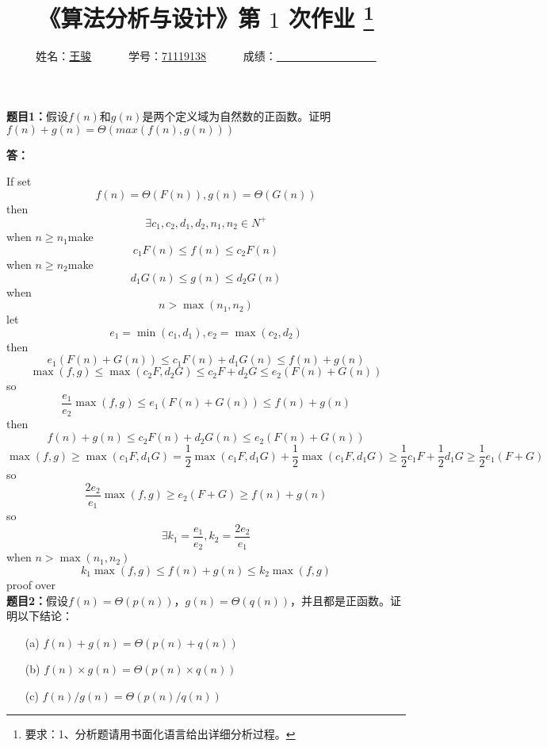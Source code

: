 \documentclass[12pt,a4paper]{article}
\begin{document}
\begin{CJK*}{UTF8}{gbsn}

  \title{
    {\textbf{《算法分析与设计》第 {$1$} 次作业}
      \footnote{要求：1、分析题请用书面化语言给出详细分析过程。}
    }
  }
  \date{}

  \author{
    姓名：\underline{王骏}~~~~~~
    学号：\underline{71119138}~~~~~~
    成绩：\underline{~~~~~~~~~~~~~~~~~~}
  }

  \maketitle

  \noindent
  \section*{\bf \color{red}{算法分析题}}
  \noindent
  {\bf 题目1：}假设$f(n)$和$g(n)$是两个定义域为自然数的正函数。证明 $f(n)+g(n)=\varTheta(max(f(n),g(n)))$

  \vspace{5pt}
  \noindent
  {\bf 答：}

    If set
    $$f(n) = \varTheta(F(n)), g(n) = \varTheta(G(n))$$ 
    then 
    $$\exists c_1,c_2,d_1,d_2,n_1,n_2\in N^+$$
    when $n \geq n_1$make
    $$c_1F(n) \leq f(n) \leq c_2F(n)$$
    when $n \geq n_2$make
    $$d_1G(n) \leq g(n) \leq d_2G(n)$$
    when
    $$n > \max(n_1,n_2)$$
    let 
    $$e_1 = \min(c_1,d_1), e_2 = \max(c_2,d_2)$$
    then
    $$ e_1 (F(n)+G(n)) \leq c_1F(n) + d_1G(n) \leq f(n) + g(n)$$
    $$ \max(f,g) \leq \max(c_2F,d_2G) \leq c_2F + d_2G \leq e_2 (F(n)+G(n))$$
    so 
    $$ \frac{e_1}{e_2} \max(f,g) \leq e_1(F(n)+G(n)) \leq f(n)+g(n)$$
    then
    $$f(n) + g(n) \leq c_2F(n) + d_2G(n) \leq e_2(F(n)+G(n))$$ 
    $$\max(f,g) \geq \max(c_1F,d_1G) = \frac{1}{2} \max(c_1F,d_1G) + \frac{1}{2} \max(c_1F,d_1G) \geq \frac{1}{2}c_1F + \frac{1}{2}d_1G \geq \frac{1}{2}e_1(F+G) $$
    so
    $$\frac{2e_2}{e_1}\max(f,g) \geq e_2(F+G) \geq f(n)+g(n)$$
    so
    $$\exists k_1=\frac{e_1}{e_2}, k_2=\frac{2e_2}{e_1}$$
    when $n > \max(n_1,n_2)$
    $$k_1\max(f,g) \leq f(n)+g(n) \leq k_2\max(f,g)$$
    proof over \\

  \vspace{10pt}
  \noindent
  {\bf 题目2：}假设$f(n)=\varTheta(p(n))$，$g(n)=\varTheta(q(n))$，并且都是正函数。证明以下结论：
  \begin{enumerate}
    \item[(a)]  $f(n)+g(n)=\varTheta(p(n)+q(n))$
    \item[(b)]  $f(n)\times g(n)=\varTheta(p(n)\times q(n))$
    \item[(c)]  $f(n)/g(n)=\varTheta(p(n)/q(n))$
  \end{enumerate}


\end{CJK*}
\end{document}
